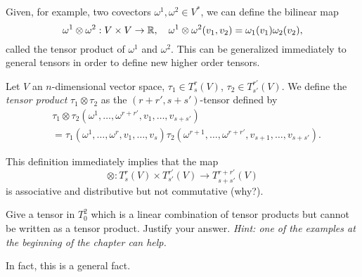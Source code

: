 Given, for example, two covectors $\omega^1, \omega^2 \in V^*$, we can define the bilinear map
\begin{equation}
  \omega^1\otimes \omega^2 : V\times V \to \mathbb{R},\quad
  \omega^1\otimes \omega^2(v_1, v_2) = \omega_1(v_1)\omega_2(v_2),
\end{equation}
called the tensor product of $\omega^1$ and $\omega^2$.
This can be generalized immediately to general tensors in order to define new higher order tensors.

\begin{definition}
  Let $V$ an $n$-dimensional vector space, $\tau_1\in T_s^r(V)$, $\tau_2\in T_{s'}^{r'}(V)$.
  We define the \emph{tensor product} $\tau_1\otimes\tau_2$ as the $(r+r', s+s')$-tensor defined by
  \begin{align}
    &\tau_1\otimes\tau_2(\omega^1,\ldots,\omega^{r+r'}, v_1,\ldots,v_{s+s'}) \\
    &= \tau_1(\omega^1,\ldots,\omega^{r}, v_1,\ldots,v_{s}) \tau_2(\omega^{r+1},\ldots,\omega^{r+r'}, v_{s+1},\ldots,v_{s+s'}).
  \end{align}
\end{definition}

This definition immediately implies that the map
\begin{equation}
  \otimes :  T_s^r(V)\times T_{s'}^{r'}(V) \to T_{s+s'}^{r+r'}(V)
\end{equation}
is associative and distributive but not commutative (why?).

\begin{exercise}
  Give a tensor in $T^2_0$ which is a linear combination of tensor products but cannot be written as a tensor product.
  Justify your answer.
 \textit{\small Hint: one of the examples at the beginning of the chapter can help.}
\end{exercise}

In fact, this is a general fact.


